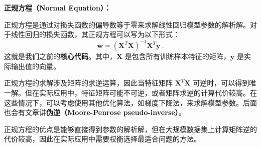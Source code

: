 \textbf{正规方程（Normal Equation）：}

正规方程是通过对损失函数的偏导数等于零来求解线性回归模型参数的解析解。对于线性回归的损失函数，其正规方程可以写为以下形式：
\begin{equation}
\mathbf{w} = (\mathbf{X}^T \mathbf{X})^{-1} \mathbf{X}^T \mathbf{y}~.
\end{equation}
这就是我们之前的\textbf{核心代码}。其中，$\mathbf{X}$ 是包含所有训练样本特征的矩阵，$\mathbf{y}$ 是实际输出值的向量。

正规方程的求解涉及矩阵的求逆运算，因此当特征矩阵 $\mathbf{X}^T \mathbf{X}$ 可逆时，可以得到唯一解。但在实际应用中，特征矩阵可能不可逆，或者矩阵求逆的计算代价较高。在这些情况下，可以考虑使用其他优化算法，如梯度下降法，来求解模型参数。后面也会有文章讲\textbf{伪逆（Moore-Penrose pseudo-inverse）}。

正规方程的优点是能够直接得到参数的解析解，但在大规模数据集上计算矩阵逆的代价较高，因此在实际应用中需要权衡选择最适合问题的方法。


